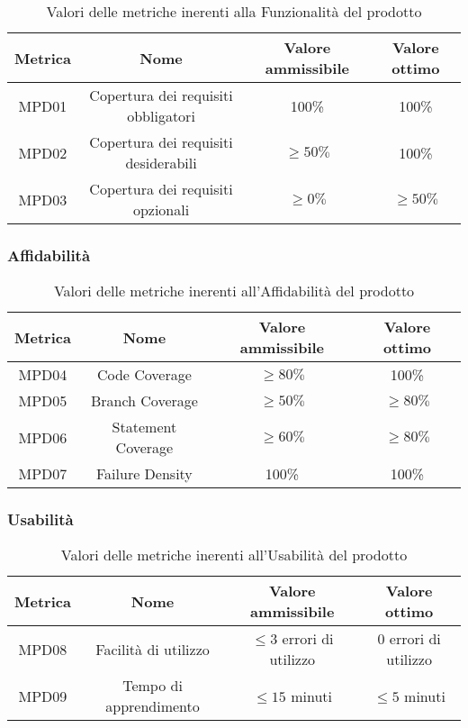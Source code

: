 \documentclass[italian,12pt]{article} %
\begin{document}
\begin{table}[h!]
	\centering
	\begin{tabular}{|c|c|c|c|} 
	 \hline
	 Metrica & Nome & Valore ammissibile & Valore ottimo \\  
	 \hline
	 MPD01 & Copertura dei requisiti obbligatori & 100\%  & 100\% \\
	 \hline
	 MPD02 & Copertura dei requisiti desiderabili & $\geq 50\% $  & 100\% \\ 
	 \hline
	 MPD03 & Copertura dei requisiti opzionali & $\geq 0\% $ & $\geq 50\% $ \\ 
	 \hline
	\end{tabular}
	\caption{ Valori delle metriche inerenti alla Funzionalità del prodotto}
	\label{table:7}
	\end{table}

\subsubsection{Affidabilità}

\begin{table}[h!]
	\centering
	\begin{tabular}{|c|c|c|c|} 
	 \hline
	 Metrica & Nome & Valore ammissibile & Valore ottimo \\  
	 \hline
	 MPD04 & Code Coverage & $\geq 80\% $  & 100\% \\
	 \hline
	 MPD05 & Branch Coverage & $\geq 50\% $  & $\geq 80\% $ \\ 
	 \hline
	 MPD06 & Statement Coverage & $\geq 60\% $ & $\geq 80\% $ \\ 
	 \hline
	 MPD07 & Failure Density & 100\%  & 100\%  \\ 
	 \hline
	\end{tabular}
	\caption{ Valori delle metriche inerenti all'Affidabilità del prodotto}
	\label{table:8}
	\end{table}


\subsubsection{Usabilità}

\begin{table}[h!]
	\centering
	\begin{tabular}{|c|c|c|c|} 
	 \hline
	 Metrica & Nome & Valore ammissibile & Valore ottimo \\  
	 \hline
	 MPD08 & Facilità di utilizzo & $\leq 3 $ errori di utilizzo & 0 errori di utilizzo \\
	 \hline
	 MPD09 & Tempo di apprendimento & $\leq 15 $ minuti  & $\leq 5 $ minuti\\ 
	 \hline
	\end{tabular}
	\caption{ Valori delle metriche inerenti all'Usabilità del prodotto}
	\label{table:9}
	\end{table}
\end{document}
